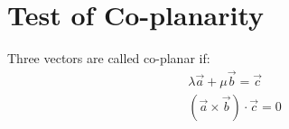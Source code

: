 \documentclass[../main.tex]{subfiles}
\begin{document}
    \section{Test of Co-planarity}
    Three vectors are called co-planar if:
    \begin{align}
        \lambda\vec{a}+\mu\vec{b}=\vec{c}\\
        (\vec{a}\times\vec{b})\cdot\vec{c}=0
    \end{align}
\end{document}
